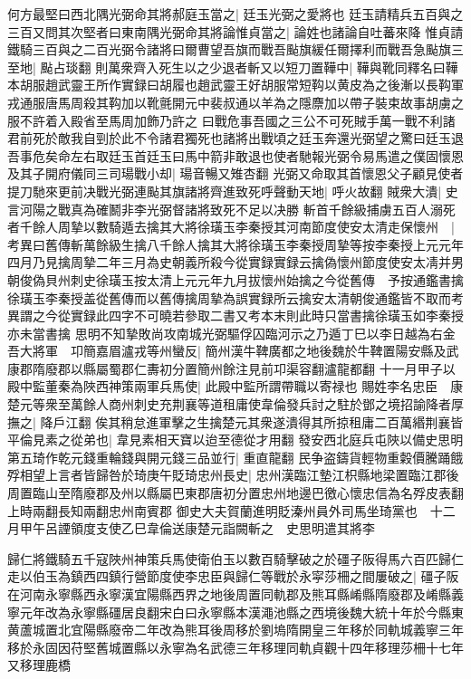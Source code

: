 何方最堅曰西北隅光弼命其將郝庭玉當之|{
	廷玉光弼之愛將也}
廷玉請精兵五百與之三百又問其次堅者曰東南隅光弼命其將論惟貞當之|{
	論姓也諸論自吐蕃來降}
惟貞請鐵騎三百與之二百光弼令諸將曰爾曹望吾旗而戰吾颭旗緩任爾擇利而戰吾急颭旗三至地|{
	颭占琰翻}
則萬衆齊入死生以之少退者斬又以短刀置鞾中|{
	鞾與靴同釋名曰鞾本胡服趙武靈王所作實録曰胡履也趙武靈王好胡服常短䩓以黄皮為之後漸以長䩓軍戎通服唐馬周殺其䩓加以靴氈開元中裴叔通以羊為之隱麖加以帶子裝束故事胡虜之服不許着入殿省至馬周加飾乃許之}
曰戰危事吾國之三公不可死賊手萬一戰不利諸君前死於敵我自剄於此不令諸君獨死也諸將出戰頃之廷玉奔還光弼望之驚曰廷玉退吾事危矣命左右取廷玉首廷玉曰馬中箭非敢退也使者馳報光弼令易馬遣之僕固懷恩及其子開府儀同三司瑒戰小却|{
	瑒音暢又雉杏翻}
光弼又命取其首懷恩父子顧見使者提刀馳來更前决戰光弼連颭其旗諸將齊進致死呼聲動天地|{
	呼火故翻}
賊衆大潰|{
	史言河陽之戰真為確鬭非李光弼督諸將致死不足以决勝}
斬首千餘級捕虜五百人溺死者千餘人周摯以數騎遁去擒其大將徐璜玉李秦授其河南節度使安太清走保懷州　|{
	考異曰舊傳斬萬餘級生擒八千餘人擒其大將徐璜玉李秦授周摯等按李秦授上元元年四月乃見擒周摯二年三月為史朝義所殺今從實録實録云擒偽懷州節度使安太凊并男朝俊偽貝州刺史徐璜玉按太清上元元年九月拔懷州始擒之今從舊傳　予按通鑑書擒徐璜玉李秦授盖從舊傳而以舊傳擒周摯為誤實録所云擒安太清朝俊通鑑皆不取而考異謂之今從實録此四字不可曉若參取二書又考本末則此時只當書擒徐璜玉如李秦授亦未當書擒}
思明不知摯敗尚攻南城光弼驅俘囚臨河示之乃遁丁巳以李日越為右金吾大將軍　卭簡嘉眉瀘戎等州蠻反|{
	簡州漢牛鞞廣都之地後魏於牛鞞置陽安縣及武康郡隋廢郡以縣屬蜀郡仁夀初分置簡州餘注見前卭渠容翻瀘龍都翻}
十一月甲子以殿中監董秦為陜西神策兩軍兵馬使|{
	此殿中監所謂帶職以寄禄也}
賜姓李名忠臣　康楚元等衆至萬餘人商州刺史充荆襄等道租庸使韋倫發兵討之駐於鄧之境招諭降者厚撫之|{
	降戶江翻}
俟其稍怠進軍擊之生擒楚元其衆遂潰得其所掠租庸二百萬緡荆襄皆平倫見素之從弟也|{
	韋見素相天寶以迨至德從才用翻}
發安西北庭兵屯陜以備史思明　第五琦作乾元錢重輪錢與開元錢三品並行|{
	重直龍翻}
民争盗鑄貨輕物重糓價騰踊餓殍相望上言者皆歸咎於琦庚午貶琦忠州長史|{
	忠州漢臨江墊江枳縣地梁置臨江郡後周置臨山至隋廢郡及州以縣屬巴東郡唐初分置忠州地邊巴徼心懷忠信為名殍皮表翻上時兩翻長知兩翻忠州南賓郡}
御史大夫賀蘭進明貶溱州員外司馬坐琦黨也　十二月甲午呂諲領度支使乙巳韋倫送康楚元詣闕斬之　史思明遣其將李

歸仁將鐵騎五千寇陜州神策兵馬使衛伯玉以數百騎擊破之於礓子阪得馬六百匹歸仁走以伯玉為鎮西四鎮行營節度使李忠臣與歸仁等戰於永寜莎柵之間屢破之|{
	礓子阪在河南永寧縣西永寧漢宜陽縣西界之地後周置同軌郡及熊耳縣崤縣隋廢郡及崤縣義寧元年改為永寧縣礓居良翻宋白曰永寧縣本漢澠池縣之西境後魏大統十年於今縣東黄蘆城置北宜陽縣廢帝二年改為熊耳後周移於劉塢隋開皇三年移於同軌城義寧三年移於永固因苻堅舊城置縣以永寧為名武德三年移理同軌貞觀十四年移理莎柵十七年又移理鹿橋}


